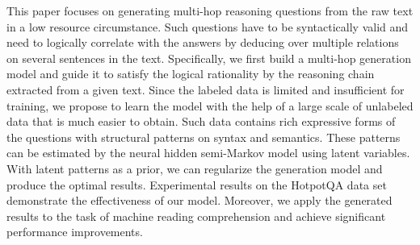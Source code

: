 This paper focuses on generating multi-hop reasoning questions from the raw text in a low resource circumstance. Such questions have to be syntactically valid and need to logically correlate with the answers by deducing over multiple relations on several sentences in the text. Specifically, we first build a multi-hop generation model and guide it to satisfy the logical rationality by the reasoning chain extracted from a given text. Since the labeled data is limited and insufficient for training, we propose to learn the model with the help of a large scale of unlabeled data that is much easier to obtain. Such data contains rich expressive forms of the questions with structural patterns on syntax and semantics. These patterns can be estimated by the neural hidden semi-Markov model using latent variables. With latent patterns as a prior, we can regularize the generation model and produce the optimal results. Experimental results on the HotpotQA data set demonstrate the effectiveness of our model. Moreover, we apply the generated results to the task of machine reading comprehension and achieve significant performance improvements.
